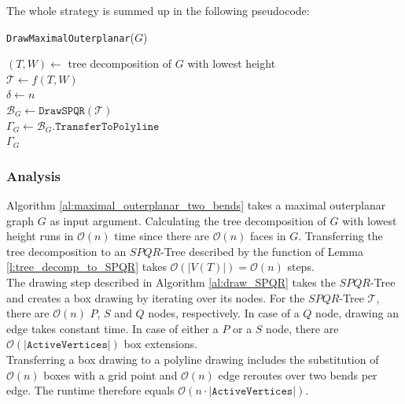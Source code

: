 The whole strategy is summed up in the following pseudocode:\\
\begin{algorithm}[H]
	\caption{\texttt{DrawMaximalOuterplanar}($G$)}\label{al:maximal_outerplanar_two_bends}
	$(T,W) \gets$ tree decomposition of $G$ with lowest height\\
	$\mathcal{T} \gets f(T,W)$\\
	$\delta \gets n$\\
	$\mathcal{B}_{G} \gets \texttt{DrawSPQR}(\mathcal{T})$\\
	$\Gamma_{G} \gets \mathcal{B}_{G}.\texttt{TransferToPolyline}$\\
	\Return $\Gamma_{G}$
\end{algorithm}

\subsubsection{Analysis}

Algorithm \ref{al:maximal_outerplanar_two_bends} takes a maximal outerplanar graph $G$ as input argument. Calculating the tree decomposition of $G$ with lowest height runs in $\mathcal{O}(n)$ time since there are $\mathcal{O}(n)$ faces in $G$. Transferring the tree decomposition to an $SPQR$-Tree described by the function of Lemma \ref{l:tree_decomp_to_SPQR} takes $\mathcal{O}(|V(T)|) = \mathcal{O}(n)$ steps.\\
The drawing step described in Algorithm \ref{al:draw_SPQR} takes the $SPQR$-Tree and creates a box drawing by iterating over its nodes. For the $SPQR$-Tree $\mathcal{T}$, there are $\mathcal{O}(n)$ $P$, $S$ and $Q$ nodes, respectively. In case of a $Q$ node, drawing an edge takes constant time. In case of either a $P$ or a $S$ node, there are $\mathcal{O}(|\texttt{ActiveVertices}|)$ box extensions.\\
Transferring a box drawing to a polyline drawing includes the substitution of $\mathcal{O}(n)$ boxes with a grid point and $\mathcal{O}(n)$ edge reroutes over two bends per edge. The runtime therefore equals $\mathcal{O}(n\cdot |\texttt{ActiveVertices}|)$.

